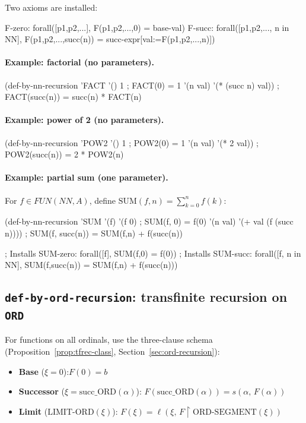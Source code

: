 Two axioms are installed:
\begin{VNBsnip}
F-zero: forall([p1,p2,...], F(p1,p2,...,0) = base-val)
F-succ: forall([p1,p2,..., n in NN],
          F(p1,p2,...,succ(n)) = succ-expr[val:=F(p1,p2,...,n)])
\end{VNBsnip}

\paragraph{Example: factorial (no parameters).}
\begin{VNBcode}
(def-by-nn-recursion 'FACT '()
  1                           ; FACT(0) = 1
  '(n val) '(* (succ n) val)) ; FACT(succ(n)) = succ(n) * FACT(n)
\end{VNBcode}

\paragraph{Example: power of 2 (no parameters).}
\begin{VNBcode}
(def-by-nn-recursion 'POW2 '()
  1                       ; POW2(0) = 1
  '(n val) '(* 2 val))   ; POW2(succ(n)) = 2 * POW2(n)
\end{VNBcode}

\paragraph{Example: partial sum (one parameter).}
\begin{sloppypar}For $f \in \mathit{FUN}(\mathit{NN}, A)$, define
$\mathrm{SUM}(f, n) = \sum_{k=0}^{n} f(k)$:\end{sloppypar}
\begin{VNBcode}
(def-by-nn-recursion 'SUM '(f)
  '(f 0)                          ; SUM(f, 0) = f(0)
  '(n val) '(+ val (f (succ n)))) ; SUM(f, succ(n)) = SUM(f,n) + f(succ(n))

; Installs SUM-zero: forall([f], SUM(f,0) = f(0))
; Installs SUM-succ: forall([f, n in NN], SUM(f,succ(n)) = SUM(f,n) + f(succ(n)))
\end{VNBcode}

\subsection{\texttt{def-by-ord-recursion}: transfinite recursion on \texttt{ORD}}

For functions on all ordinals, use the three-clause schema
(Proposition~\ref{prop:tfrec-class}, Section~\ref{sec:ord-recursion}):
\begin{itemize}
\item \textbf{Base} ($\xi = 0$):\quad $F(0) = b$
\item \textbf{Successor} ($\xi = \mathrm{succ\_ORD}(\alpha)$):\quad
      $F(\mathrm{succ\_ORD}(\alpha)) = s(\alpha,\, F(\alpha))$
\item \textbf{Limit} ($\mathrm{LIMIT\text{-}ORD}(\xi)$):\quad
      $F(\xi) = \ell\!\left(\xi,\, F\!\restriction\!\mathrm{ORD\text{-}SEGMENT}(\xi)\right)$
\end{itemize}

